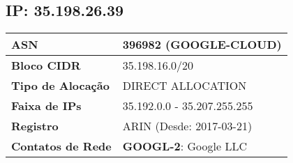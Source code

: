     \subsection{IP: 35.198.26.39}
    \begin{tabular}{|l|l|}
    \hline
    \textbf{ASN} & 396982 (GOOGLE-CLOUD) \\ \hline
    \textbf{Bloco CIDR} & 35.198.16.0/20 \\ \hline
    \textbf{Tipo de Alocação} & DIRECT ALLOCATION \\ \hline
    \textbf{Faixa de IPs} & 35.192.0.0 - 35.207.255.255 \\ \hline
    \textbf{Registro} & ARIN (Desde: 2017-03-21) \\ \hline
        
\textbf{Contatos de Rede} & \textbf{GOOGL-2}: Google LLC 
\\ \hline
\end{tabular}
